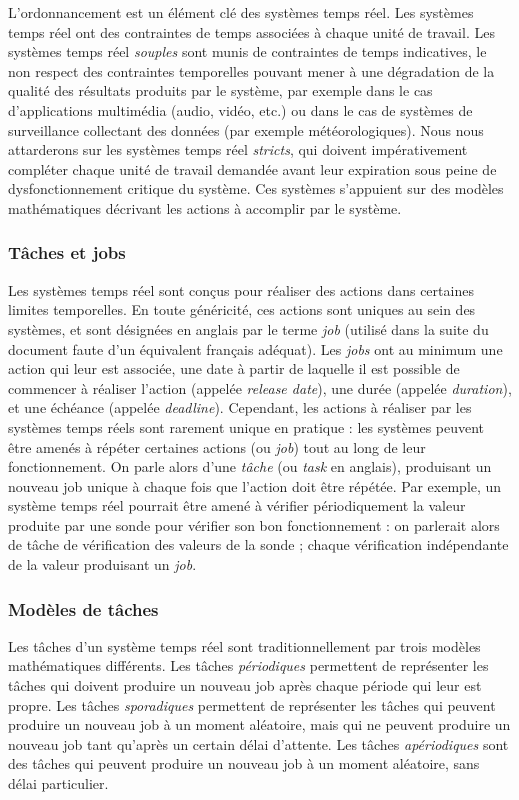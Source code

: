 		L'ordonnancement est un élément clé des systèmes temps réel. Les systèmes temps réel ont des contraintes de temps associées à chaque unité de travail. Les systèmes temps réel \emph{souples} sont munis de contraintes de temps indicatives, le non respect des contraintes temporelles pouvant mener à une dégradation de la qualité des résultats produits par le système, par exemple dans le cas d'applications multimédia (audio, vidéo, etc.) ou dans le cas de systèmes de surveillance collectant des données (par exemple météorologiques). Nous nous attarderons sur les systèmes temps réel \emph{stricts}, qui doivent impérativement compléter chaque unité de travail demandée avant leur expiration sous peine de dysfonctionnement critique du système. Ces systèmes s'appuient sur des modèles mathématiques décrivant les actions à accomplir par le système.

		\subsubsection{Tâches et jobs}
		Les systèmes temps réel sont conçus pour réaliser des actions dans certaines limites temporelles. En toute généricité, ces actions sont uniques au sein des systèmes, et sont désignées en anglais par le terme \emph{job} (utilisé dans la suite du document faute d'un équivalent français adéquat). Les \emph{jobs} ont au minimum une action qui leur est associée, une date à partir de laquelle il est possible de commencer à réaliser l'action (appelée \emph{release date}), une durée (appelée \emph{duration}), et une échéance (appelée \emph{deadline}).
		Cependant, les actions à réaliser par les systèmes temps réels sont rarement unique en pratique : les systèmes peuvent être amenés à répéter certaines actions (ou \emph{job}) tout au long de leur fonctionnement. On parle alors d'une \emph{tâche} (ou \emph{task} en anglais), produisant un nouveau job unique à chaque fois que l'action doit être répétée. Par exemple, un système temps réel pourrait être amené à vérifier périodiquement la valeur produite par une sonde pour vérifier son bon fonctionnement : on parlerait alors de tâche de vérification des valeurs de la sonde ; chaque vérification indépendante de la valeur produisant un \emph{job}.

		\subsubsection{Modèles de tâches}
		Les tâches d'un système temps réel sont traditionnellement par trois modèles mathématiques différents. Les tâches \emph{périodiques} permettent de représenter les tâches qui doivent produire un nouveau job après chaque période qui leur est propre. Les tâches \emph{sporadiques} permettent de représenter les tâches qui peuvent produire un nouveau job à un moment aléatoire, mais qui ne peuvent produire un nouveau job tant qu'après un certain délai d'attente. Les tâches \emph{apériodiques} sont des tâches qui peuvent produire un nouveau job à un moment aléatoire, sans délai particulier.

